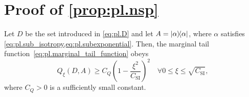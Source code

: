 \section{Proof of \cref{prop:pl.nsp}}
\label{sec:pl.proof_measurement_operator_is_good}

\begin{lemma}
  Let $D$ be the set introduced in \cref{eq:pl.D} and let $ A = \ketbra\alpha$, where $\alpha$ satisfies \cref{eq:pl.sub_isotropy,eq:pl.subexponential}.
  Then, the marginal tail function~\eqref{eq:pl.marginal_tail_function} obeys
  \[
    Q_\xi (D,  A) \geq  C_Q \left( 1-  \frac{\xi^2}{C_\mathrm{SI}}\right)^2  \quad \forall 0 \leq \xi \leq \sqrt{C_\mathrm{SI}},
  \]
  where $C_Q>0$ is a sufficiently small constant.
\end{lemma}

